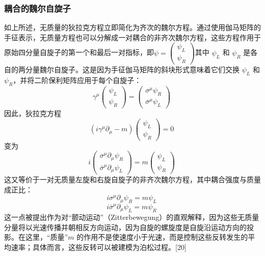 \subsubsection{耦合的魏尔自旋子}
如上所述，无质量的狄拉克方程立即简化为齐次的魏尔方程。通过使用伽马矩阵的手征表示，无质量方程也可以分解成一对耦合的非齐次魏尔方程，这些方程作用于原始四分量自旋子的第一个和最后一对指标，即\(\psi = \begin{pmatrix} \psi_L \\ \psi_R \end{pmatrix}\)其中 \(\psi_L\) 和 \(\psi_R\) 是各自的两分量魏尔自旋子。这是因为手征伽马矩阵的斜块形式意味着它们交换 \(\psi_L\) 和 \(\psi_R\)，并将二阶保利矩阵应用于每个自旋子：
\[
\gamma^\mu \begin{pmatrix} \psi_L \\ \psi_R \end{pmatrix} = \begin{pmatrix} \sigma^\mu \psi_R \\ \overline{\sigma}^\mu \psi_L \end{pmatrix}~
\]
因此，狄拉克方程
\[
(i \gamma^\mu \partial_\mu - m) \begin{pmatrix} \psi_L \\ \psi_R \end{pmatrix} = 0~
\]
变为
\[
i \begin{pmatrix} \sigma^\mu \partial_\mu \psi_R \\ \overline{\sigma}^\mu \partial_\mu \psi_L \end{pmatrix} = m \begin{pmatrix} \psi_L \\ \psi_R \end{pmatrix}~
\]
这又等价于一对无质量左旋和右旋自旋子的非齐次魏尔方程，其中耦合强度与质量成正比：
\[
i \sigma^\mu \partial_\mu \psi_R = m \psi_L~
\]
\[
i \overline{\sigma}^\mu \partial_\mu \psi_L = m \psi_R~
\]
这一点被提出作为对“颤动运动”（Zitterbewegung）的直观解释，因为这些无质量分量将以光速传播并朝相反方向运动，因为自旋的螺旋度是自旋沿运动方向的投影。在这里，“质量”\(m\) 的作用不是使速度小于光速，而是控制这些反转发生的平均速率；具体而言，这些反转可以被建模为泊松过程。[20]


















